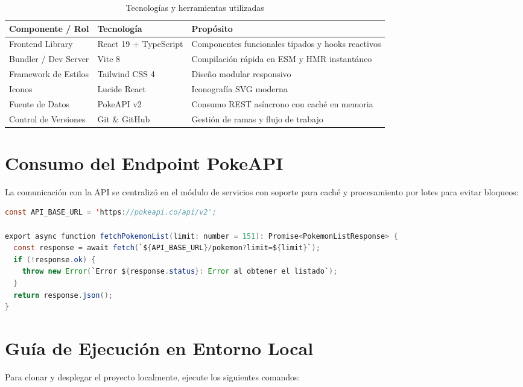 \documentclass[12pt,a4paper]{article}
\begin{document}
\begin{table}[H]
\centering
\begin{tabularx}{\textwidth}{@{}l l X@{}}
\toprule
\textbf{Componente / Rol} & \textbf{Tecnología} & \textbf{Propósito} \\ \midrule
Frontend Library & React 19 + TypeScript & Componentes funcionales tipados y hooks reactivos \\
Bundler / Dev Server & Vite 8 & Compilación rápida en ESM y HMR instantáneo \\
Framework de Estilos & Tailwind CSS 4 & Diseño modular responsivo \\
Iconos & Lucide React & Iconografía SVG moderna \\
Fuente de Datos & PokeAPI v2 & Consumo REST asíncrono con caché en memoria \\
Control de Versiones & Git \& GitHub & Gestión de ramas y flujo de trabajo \\ \bottomrule
\end{tabularx}
\caption{Tecnologías y herramientas utilizadas}
\end{table}

\section{Consumo del Endpoint PokeAPI}

La comunicación con la API se centralizó en el módulo de servicios con soporte para caché y procesamiento por lotes para evitar bloqueos:

\begin{lstlisting}[language=Java, caption={Servicio de consulta (\texttt{src/services/pokemonService.ts})}]
const API_BASE_URL = 'https://pokeapi.co/api/v2';

export async function fetchPokemonList(limit: number = 151): Promise<PokemonListResponse> {
  const response = await fetch(`${API_BASE_URL}/pokemon?limit=${limit}`);
  if (!response.ok) {
    throw new Error(`Error ${response.status}: Error al obtener el listado`);
  }
  return response.json();
}
\end{lstlisting}

\section{Guía de Ejecución en Entorno Local}

Para clonar y desplegar el proyecto localmente, ejecute los siguientes comandos:
\end{document}
